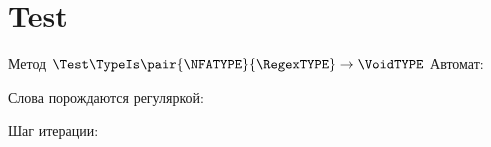 \section{Test}
\begin{frame}[fragile]{Метод $\Test\TypeIs\pair{\NFATYPE}{\RegexTYPE}\to\VoidTYPE$}
    Автомат:


    Слова порождаются регуляркой:

    Шаг итерации:



\end{frame}

